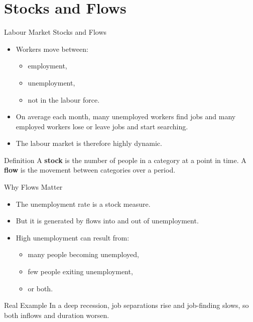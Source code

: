 \documentclass[aspectratio=169]{beamer}
\begin{document}
\section{Stocks and Flows}

\begin{frame}{Labour Market Stocks and Flows}
\transfade
\begin{itemize}[<+->]
  \item Workers move between:
  \begin{itemize}[<+->]
    \item employment,
    \item unemployment,
    \item not in the labour force.
  \end{itemize}
  \item On average each month, many unemployed workers find jobs and many employed workers lose or leave jobs and start searching.
  \item The labour market is therefore highly dynamic.
\end{itemize}

\begin{block}{Definition}
A \textbf{stock} is the number of people in a category at a point in time. A \textbf{flow} is the movement between categories over a period.
\end{block}
\end{frame}

\begin{frame}{Why Flows Matter}
\transfade
\begin{itemize}[<+->]
  \item The unemployment rate is a stock measure.
  \item But it is generated by flows into and out of unemployment.
  \item High unemployment can result from:
  \begin{itemize}[<+->]
    \item many people becoming unemployed,
    \item few people exiting unemployment,
    \item or both.
  \end{itemize}
\end{itemize}

\begin{exampleblock}{Real Example}
In a deep recession, job separations rise and job-finding slows, so both inflows and duration worsen.
\end{exampleblock}
\end{frame}
\end{document}
